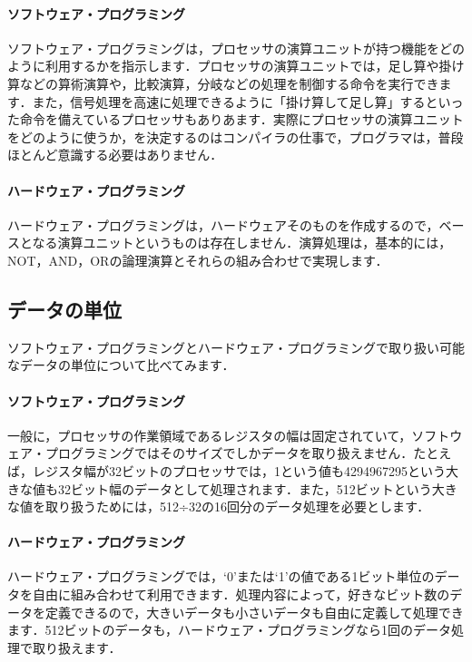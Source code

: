 \documentclass[a4paper,dvipdfmx]{jsarticle}
\begin{document}
\paragraph{ソフトウェア・プログラミング}
ソフトウェア・プログラミングは，プロセッサの演算ユニットが持つ機能をどのように利用するかを指示します．プロセッサの演算ユニットでは，足し算や掛け算などの算術演算や，比較演算，分岐などの処理を制御する命令を実行できます．また，信号処理を高速に処理できるように「掛け算して足し算」するといった命令を備えているプロセッサもありあます．実際にプロセッサの演算ユニットをどのように使うか，を決定するのはコンパイラの仕事で，プログラマは，普段ほとんど意識する必要はありません．

\paragraph{ハードウェア・プログラミング}
ハードウェア・プログラミングは，ハードウェアそのものを作成するので，ベースとなる演算ユニットというものは存在しません．演算処理は，基本的には，NOT，AND，ORの論理演算とそれらの組み合わせで実現します．

\subsection{データの単位}
ソフトウェア・プログラミングとハードウェア・プログラミングで取り扱い可能なデータの単位について比べてみます．

\paragraph{ソフトウェア・プログラミング}
一般に，プロセッサの作業領域であるレジスタの幅は固定されていて，ソフトウェア・プログラミングではそのサイズでしかデータを取り扱えません．たとえば，レジスタ幅が32ビットのプロセッサでは，1という値も4294967295という大きな値も32ビット幅のデータとして処理されます．また，512ビットという大きな値を取り扱うためには，512÷32の16回分のデータ処理を必要とします．

\paragraph{ハードウェア・プログラミング}
ハードウェア・プログラミングでは，‘0’または‘1’の値である1ビット単位のデータを自由に組み合わせて利用できます．処理内容によって，好きなビット数のデータを定義できるので，大きいデータも小さいデータも自由に定義して処理できます．512ビットのデータも，ハードウェア・プログラミングなら1回のデータ処理で取り扱えます．
\end{document}
